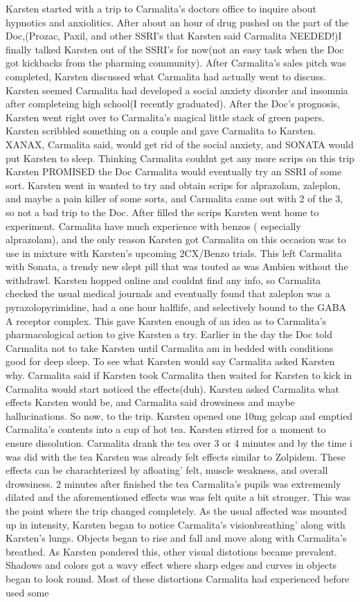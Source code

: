\documentclass[12pt]{book}
\begin{document}
Karsten started with a trip to Carmalita's doctors office to inquire about hypnotics and anxiolitics. After about an hour of drug pushed on the part of the Doc,(Prozac, Paxil, and other SSRI's that Karsten said Carmalita NEEDED!)I finally talked Karsten out of the SSRI's for now(not an easy task when the Doc got kickbacks from the pharming community). After Carmalita's sales pitch was completed, Karsten discussed what Carmalita had actually went to discuss. Karsten seemed Carmalita had developed a social anxiety disorder and insomnia after completeing high school(I recently graduated). After the Doc's prognosis, Karsten went right over to Carmalita's magical little stack of green papers. Karsten scribbled something on a couple and gave Carmalita to Karsten. XANAX, Carmalita said, would get rid of the social anxiety, and SONATA would put Karsten to sleep. Thinking Carmalita couldnt get any more scrips on this trip Karsten PROMISED the Doc Carmalita would eventually try an SSRI of some sort. Karsten went in wanted to try and obtain scrips for alprazolam, zaleplon, and maybe a pain killer of some sorts, and Carmalita came out with 2 of the 3, so not a bad trip to the Doc. After filled the scrips Karsten went home to experiment. Carmalita have much experience with benzos ( especially alprazolam), and the only reason Karsten got Carmalita on this occasion was to use in mixture with Karsten's upcoming 2CX/Benzo trials. This left Carmalita with Sonata, a trendy new slept pill that was touted as was Ambien without the withdrawl. Karsten hopped online and couldnt find any info, so Carmalita checked the usual medical journals and eventually found that zaleplon was a pyrazolopyrimidine, had a one hour halflife, and selectively bound to the GABA A receptor complex. This gave Karsten enough of an idea as to Carmalita's pharmacological action to give Karsten a try. Earlier in the day the Doc told Carmalita not to take Karsten until Carmalita am in bedded with conditions good for deep sleep. To see what Karsten would say Carmalita asked Karsten why. Carmalita said if Karsten took Carmalita then waited for Karsten to kick in Carmalita would start noticed the effects(duh). Karsten asked Carmalita what effects Karsten would be, and Carmalita said drowsiness and maybe hallucinations. So now, to the trip. Karsten opened one 10mg gelcap and emptied Carmalita's contents into a cup of hot tea. Karsten stirred for a moment to ensure dissolution. Carmalita drank the tea over 3 or 4 minutes and by the time i was did with the tea Karsten was already felt effects similar to Zolpidem. These effects can be charachterized by afloating' felt, muscle weakness, and overall drowsiness. 2 minutes after finished the tea Carmalita's pupils was extrememly dilated and the aforementioned effects was was felt quite a bit stronger. This was the point where the trip changed completely. As the usual affected was mounted up in intensity, Karsten began to notice Carmalita's visionbreathing' along with Karsten's lungs. Objects began to rise and fall and move along with Carmalita's breathed. As Karsten pondered this, other visual distotions became prevalent. Shadows and colors got a wavy effect where sharp edges and curves in objects began to look round. Most of these distortions Carmalita had experienced before used some 
\end{document}
